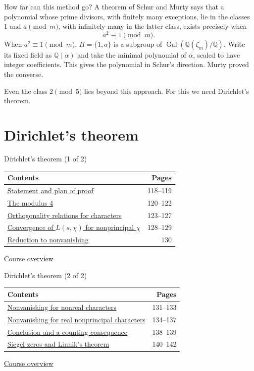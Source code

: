 \documentclass[aspectratio=169,11pt]{beamer}
\begin{document}
\begin{frame}{How far can this method go?}
A theorem of Schur and Murty says that a polynomial whose prime divisors, with finitely many exceptions, lie in the classes $1$ and $a\pmod m$, with infinitely many in the latter class, exists precisely when
\[a^2\equiv1\pmod m.\]
When $a^2\equiv1\pmod m$, $H=\{1,a\}$ is a subgroup of $\operatorname{Gal}(\mathbb Q(\zeta_m)/\mathbb Q)$. Write its fixed field as $\mathbb Q(\alpha)$ and take the minimal polynomial of $\alpha$, scaled to have integer coefficients. This gives the polynomial in Schur's direction. Murty proved the converse.

Even the class $2\pmod5$ lies beyond this approach. For this we need Dirichlet's theorem.
\end{frame}


\section{Dirichlet's theorem}

\begin{frame}{Dirichlet's theorem (1 of 2)}
\small\renewcommand{\arraystretch}{1.35}
\begin{tabular}{p{}r}\textbf{Contents}&\textbf{Pages}\\\midrule
\hyperlink{Navigation118}{Statement and plan of proof}&118--119\\
\hyperlink{Navigation120}{The modulus 4}&120--122\\
\hyperlink{Navigation123}{Orthogonality relations for characters}&123--127\\
\hyperlink{Navigation128}{Convergence of $L(s,\chi)$ for nonprincipal $\chi$}&128--129\\
\hyperlink{Navigation130}{Reduction to nonvanishing}&130\\
\end{tabular}\par\medskip\hyperlink{overview}{\color{teal}Course overview}\end{frame}


\begin{frame}{Dirichlet's theorem (2 of 2)}
\small\renewcommand{\arraystretch}{1.35}
\begin{tabular}{p{}r}\textbf{Contents}&\textbf{Pages}\\\midrule
\hyperlink{Navigation131}{Nonvanishing for nonreal characters}&131--133\\
\hyperlink{Navigation134}{Nonvanishing for real nonprincipal characters}&134--137\\
\hyperlink{Navigation138}{Conclusion and a counting consequence}&138--139\\
\hyperlink{Navigation140}{Siegel zeros and Linnik's theorem}&140--142\\
\end{tabular}\par\medskip\hyperlink{overview}{\color{teal}Course overview}\end{frame}
\end{document}

